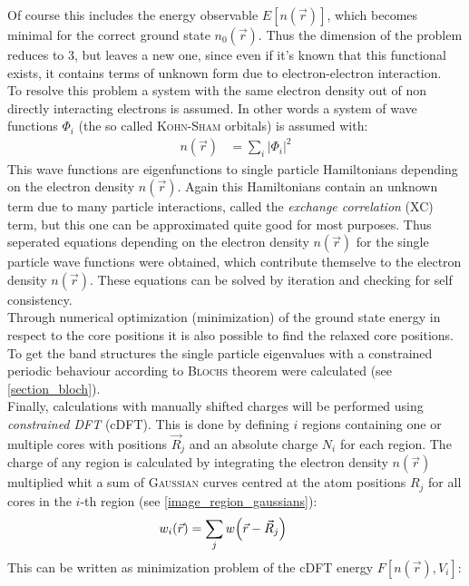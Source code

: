 Of course this includes the energy observable $E[n\left(\vec{r}\right)]$, which becomes minimal for the correct ground state $n_0\left(\vec{r}\right)$. Thus the dimension of the problem reduces to $3$, but leaves a new one, since even if it's known that this functional exists, it contains terms of unknown form due to electron-electron interaction.\\
To resolve this problem a system with the same electron density out of non directly interacting electrons is assumed. In other words a system of wave functions $\varPhi_i$ (the so called \textsc{Kohn-Sham} orbitals) is assumed with:
\begin{align}
n\left(\vec{r}\right) &= \sum_i \left|\varPhi_i\right|^2
\end{align}
This wave functions are eigenfunctions to single particle Hamiltonians depending on the electron density $n(\vec{r})$. Again this Hamiltonians contain an unknown term due to many particle interactions, called the \emph{exchange correlation} (XC) term, but this one can be approximated quite good for most purposes. Thus seperated equations depending on the electron density $n\left(\vec{r}\right)$ for the single particle wave functions were obtained, which contribute themselve to the electron density $n\left(\vec{r}\right)$. These equations can be solved by iteration and checking for self consistency.\\
Through numerical optimization (minimization) of the ground state energy in respect to the core positions it is also possible to find the relaxed core positions.\\
To get the band structures the single particle eigenvalues with a constrained periodic behaviour according to \textsc{Blochs} theorem were calculated (see \cref{section_bloch}).\\
Finally, calculations with manually shifted charges will be performed using \emph{constrained DFT} (cDFT). This is done by defining $i$ regions containing one or multiple cores with positions $\vec{R}_j$ and an absolute charge $N_i$ for each region. The charge of any region is calculated by integrating the electron density $n\left(\vec{r}\right)$ multiplied whit a sum of \textsc{Gaussian} curves centred at the atom positions $R_j$ for all cores in the $i$-th region (see \cref{image_region_gaussians}):
\begin{align}
w_i\left(\vec{r}\right) &= \sum_j w\left(\vec{r} - \vec{R}_j\right) \text{\quad}
\end{align}
This can be written as minimization problem of the cDFT energy $F[n\left(\vec{r}\right), V_i]$:
